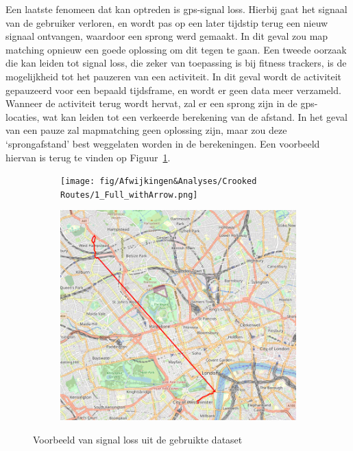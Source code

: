Een laatste fenomeen dat kan optreden is \ac{gps}-signal loss. Hierbij gaat het
signaal van de gebruiker verloren, en wordt pas op een later tijdstip terug een
nieuw signaal ontvangen, waardoor een sprong werd gemaakt. In dit geval zou map
matching opnieuw een goede oplossing om dit tegen te gaan. Een tweede oorzaak
die kan leiden tot signal loss, die zeker van toepassing is bij fitness
trackers, is de mogelijkheid tot het pauzeren van een activiteit. In dit geval
wordt de activiteit gepauzeerd voor een bepaald tijdsframe, en wordt er geen
data meer verzameld. Wanneer de activiteit terug wordt hervat, zal er een
sprong zijn in de \ac{gps}-locaties, wat kan leiden tot een verkeerde
berekening van de afstand. In het geval van een pauze zal mapmatching geen
oplossing zijn, maar zou deze `sprongafstand' best weggelaten worden in de
berekeningen. Een voorbeeld hiervan is terug te vinden op
Figuur~\ref{fig:gps_signal_loss}.
\begin{figure}
    \begin{subfigure}[b]{0.49\textwidth}
        \centering
        \texttt{[image: fig/Afwijkingen\&Analyses/Crooked Routes/1\_Full\_withArrow.png]}
    \end{subfigure}
    \begin{subfigure}[b]{0.49\textwidth}
        \centering
        \includegraphics[width=\textwidth]{fig/Afwijkingen&Analyses/Crooked Routes/1_Full_original.png}
    \end{subfigure}
    \caption{Voorbeeld van signal loss uit de gebruikte dataset}\label{fig:gps_signal_loss}
\end{figure}


